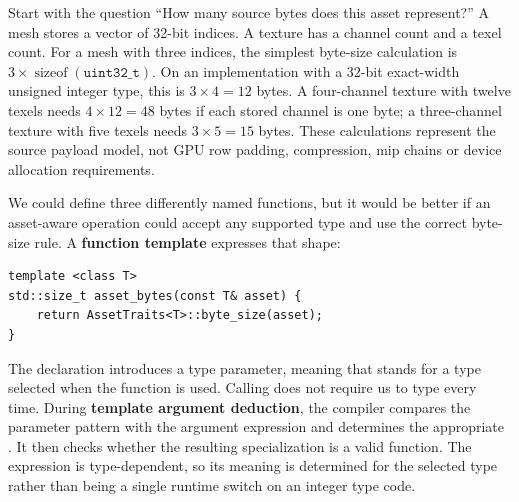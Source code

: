 \hypertarget{01-foundations-i-ch005-the-repeated-operation-is-a-function-whose-input-type-can-vary}{}

Start with the question ``How many source bytes does this asset represent?'' A mesh stores a vector of 32-bit indices. A texture has a channel count and a texel count. For a mesh with three indices, the simplest byte-size calculation is \(3\times\operatorname{sizeof}(\texttt{uint32\_t})\). On an implementation with a 32-bit exact-width unsigned integer type, this is \(3\times4=12\) bytes. A four-channel texture with twelve texels needs \(4\times12=48\) bytes if each stored channel is one byte; a three-channel texture with five texels needs \(3\times5=15\) bytes. These calculations represent the source payload model, not GPU row padding, compression, mip chains or device allocation requirements.

We could define three differently named functions, but it would be better if an asset-aware operation could accept any supported type and use the correct byte-size rule. A \textbf{function template} expresses that shape:

\begin{verbatim}
template <class T>
std::size_t asset_bytes(const T& asset) {
    return AssetTraits<T>::byte_size(asset);
}
\end{verbatim}

The  declaration introduces a type parameter, meaning that  stands for a type selected when the function is used. Calling  does not require us to type  every time. During \textbf{template argument deduction}, the compiler compares the parameter pattern  with the argument expression and determines the appropriate . It then checks whether the resulting specialization is a valid function. The expression  is type-dependent, so its meaning is determined for the selected type rather than being a single runtime switch on an integer type code.


